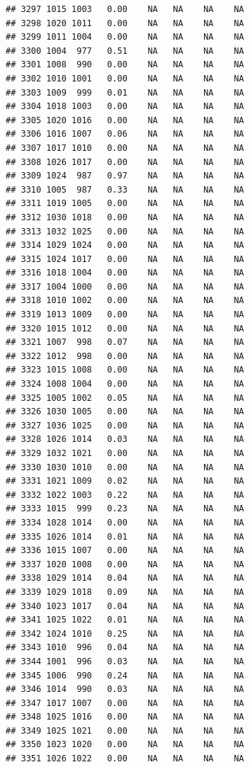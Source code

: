 \documentclass{article}\usepackage{graphicx, color}
\makeatletter
\newenvironment{kframe}{%
 \def\at@end@of@kframe{}%
 \ifinner\ifhmode%
  \def\at@end@of@kframe{\end{minipage}}%
  \begin{minipage}{\columnwidth}%
 \fi\fi%
 \def\FrameCommand##1{\hskip\@totalleftmargin \hskip-\fboxsep
 \colorbox{shadecolor}{##1}\hskip-\fboxsep
     \hskip-\linewidth \hskip-\@totalleftmargin \hskip\columnwidth}%
 \MakeFramed {\advance\hsize-\width
   \@totalleftmargin\z@ \linewidth\hsize
   \@setminipage}}%
 {\par\unskip\endMakeFramed%
 \at@end@of@kframe}
\newenvironment{knitrout}{}{} %
\makeatother
\begin{document}
\begin{knitrout}
\begin{kframe}
\begin{verbatim}
## 3297 1015 1003   0.00    NA   NA    NA    NA
## 3298 1020 1011   0.00    NA   NA    NA    NA
## 3299 1011 1004   0.00    NA   NA    NA    NA
## 3300 1004  977   0.51    NA   NA    NA    NA
## 3301 1008  990   0.00    NA   NA    NA    NA
## 3302 1010 1001   0.00    NA   NA    NA    NA
## 3303 1009  999   0.01    NA   NA    NA    NA
## 3304 1018 1003   0.00    NA   NA    NA    NA
## 3305 1020 1016   0.00    NA   NA    NA    NA
## 3306 1016 1007   0.06    NA   NA    NA    NA
## 3307 1017 1010   0.00    NA   NA    NA    NA
## 3308 1026 1017   0.00    NA   NA    NA    NA
## 3309 1024  987   0.97    NA   NA    NA    NA
## 3310 1005  987   0.33    NA   NA    NA    NA
## 3311 1019 1005   0.00    NA   NA    NA    NA
## 3312 1030 1018   0.00    NA   NA    NA    NA
## 3313 1032 1025   0.00    NA   NA    NA    NA
## 3314 1029 1024   0.00    NA   NA    NA    NA
## 3315 1024 1017   0.00    NA   NA    NA    NA
## 3316 1018 1004   0.00    NA   NA    NA    NA
## 3317 1004 1000   0.00    NA   NA    NA    NA
## 3318 1010 1002   0.00    NA   NA    NA    NA
## 3319 1013 1009   0.00    NA   NA    NA    NA
## 3320 1015 1012   0.00    NA   NA    NA    NA
## 3321 1007  998   0.07    NA   NA    NA    NA
## 3322 1012  998   0.00    NA   NA    NA    NA
## 3323 1015 1008   0.00    NA   NA    NA    NA
## 3324 1008 1004   0.00    NA   NA    NA    NA
## 3325 1005 1002   0.05    NA   NA    NA    NA
## 3326 1030 1005   0.00    NA   NA    NA    NA
## 3327 1036 1025   0.00    NA   NA    NA    NA
## 3328 1026 1014   0.03    NA   NA    NA    NA
## 3329 1032 1021   0.00    NA   NA    NA    NA
## 3330 1030 1010   0.00    NA   NA    NA    NA
## 3331 1021 1009   0.02    NA   NA    NA    NA
## 3332 1022 1003   0.22    NA   NA    NA    NA
## 3333 1015  999   0.23    NA   NA    NA    NA
## 3334 1028 1014   0.00    NA   NA    NA    NA
## 3335 1026 1014   0.01    NA   NA    NA    NA
## 3336 1015 1007   0.00    NA   NA    NA    NA
## 3337 1020 1008   0.00    NA   NA    NA    NA
## 3338 1029 1014   0.04    NA   NA    NA    NA
## 3339 1029 1018   0.09    NA   NA    NA    NA
## 3340 1023 1017   0.04    NA   NA    NA    NA
## 3341 1025 1022   0.01    NA   NA    NA    NA
## 3342 1024 1010   0.25    NA   NA    NA    NA
## 3343 1010  996   0.04    NA   NA    NA    NA
## 3344 1001  996   0.03    NA   NA    NA    NA
## 3345 1006  990   0.24    NA   NA    NA    NA
## 3346 1014  990   0.03    NA   NA    NA    NA
## 3347 1017 1007   0.00    NA   NA    NA    NA
## 3348 1025 1016   0.00    NA   NA    NA    NA
## 3349 1025 1021   0.00    NA   NA    NA    NA
## 3350 1023 1020   0.00    NA   NA    NA    NA
## 3351 1026 1022   0.00    NA   NA    NA    NA

\end{verbatim}
\end{kframe}
\end{knitrout}
\end{document}
